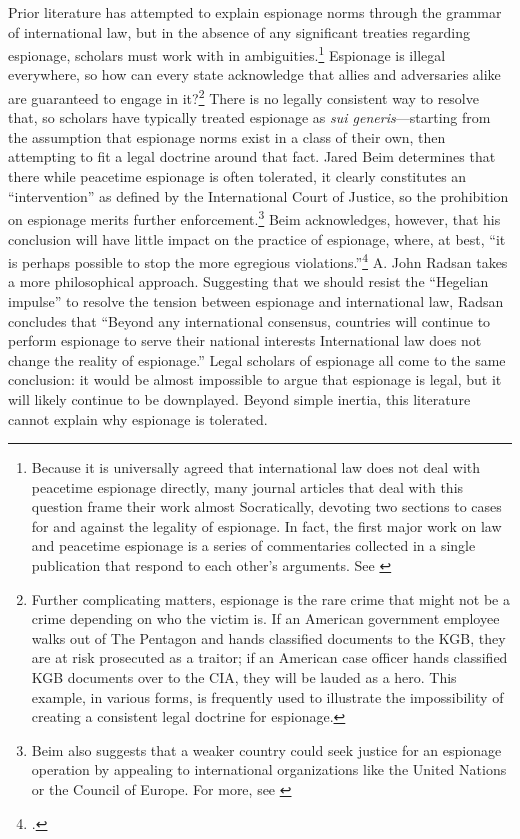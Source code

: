\documentclass[14pt]{extarticle}
\begin{document}
Prior literature has attempted to explain espionage norms through the grammar of international law, but in the absence of any significant treaties regarding espionage, scholars must work with in ambiguities.\footnote{Because it is universally agreed that international law does not deal with peacetime espionage directly, many journal articles that deal with this question frame their work almost Socratically, devoting two sections to cases for and against the legality of espionage. In fact, the first major work on law and peacetime espionage is a series of commentaries collected in a single publication that respond to each other's arguments. See \cite{wright_essays_1962}} Espionage is illegal everywhere, so how can every state acknowledge that allies and adversaries alike are guaranteed to engage in it?\footnote{Further complicating matters, espionage is the rare crime that might not be a crime depending on who the victim is. If an American government employee walks out of The Pentagon and hands classified documents to the KGB, they are at risk prosecuted as a traitor; if an American case officer hands classified KGB documents over to the CIA, they will be lauded as a hero. This example, in various forms, is frequently used to illustrate the impossibility of creating a consistent legal doctrine for espionage.} There is no legally consistent way to resolve that, so scholars have typically treated espionage as \emph{sui generis}---starting from the assumption that espionage norms exist in a class of their own, then attempting to fit a legal doctrine around that fact. Jared Beim determines that there while peacetime espionage is often tolerated, it clearly constitutes an \enquote{intervention} as defined by the International Court of Justice, so the prohibition on espionage merits further enforcement.\footnote{Beim also suggests that a weaker country could seek justice for an espionage operation by appealing to international organizations like the United Nations or the Council of Europe. For more, see \cite{beim_enforcing_2018}} Beim acknowledges, however, that his conclusion will have little impact on the practice of espionage, where, at best, \enquote{it is perhaps possible to stop the more egregious violations.}\footcite[p.~672]{beim_enforcing_2018} A. John Radsan takes a more philosophical approach. Suggesting that we should resist the \enquote{Hegelian impulse} to resolve the tension between espionage and international law, Radsan concludes that \enquote{Beyond any international consensus, countries will continue to perform espionage to serve their national interests \textelp{} International law does not change the reality of espionage.} Legal scholars of espionage all come to the same conclusion: it would be almost impossible to argue that espionage is legal, but it will likely continue to be downplayed. Beyond simple inertia, this literature cannot explain why espionage is tolerated.
\end{document}
